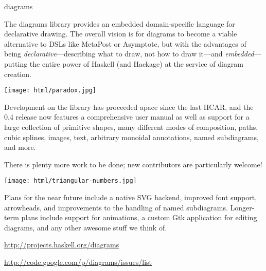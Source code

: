 \begin{hcarentry}[updated]{diagrams}
\makeheader

The diagrams library provides an embedded domain-specific language for
declarative drawing.  The overall vision is for diagrams to become a
viable alternative to DSLs like MetaPost or Asymptote, but with the
advantages of being \emph{declarative}---describing what to draw, not
how to draw it---and \emph{embedded}---putting the entire power of
Haskell (and Hackage) at the service of diagram creation.

\begin{center}
\texttt{[image: html/paradox.jpg]}
\end{center}

Development on the library has proceeded apace since the last HCAR,
and the 0.4 release now features a comprehensive user manual as well
as support for a large collection of primitive shapes, many different
modes of composition, paths, cubic splines, images, text, arbitrary
monoidal annotations, named subdiagrams, and more.

There is plenty more work to be done; new contributors are
particularly welcome!

\begin{center}
\texttt{[image: html/triangular-numbers.jpg]}
\end{center}

\FuturePlans

Plans for the near future include a native SVG backend, improved font
support, arrowheads, and improvements to the handling of named
subdiagrams.  Longer-term plans include support for animations, a
custom Gtk application for editing diagrams, and any other awesome
stuff we think of.

\FurtherReading
\begin{compactitem}
\item \url{http://projects.haskell.org/diagrams}
\item \url{http://code.google.com/p/diagrams/issues/list}
\end{compactitem}
\end{hcarentry}

